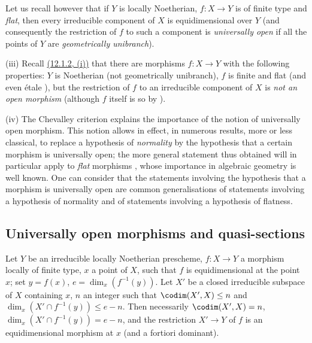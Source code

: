 \begin{remarks}[14.4.10]
Let us recall however  that if $Y$ is locally Noetherian, $f:X\to Y$ is of finite type and \emph{flat}, then every irreducible component of $X$ is equidimensional over $Y$ (and consequently the restriction of $f$ to such a component is \emph{universally open} if all the points of $Y$ are \emph{geometrically unibranch}).

(iii) Recall \hyperref[IV.12.1.2]{(12.1.2, (i))} that there are morphisms $f:X\to Y$ with the following properties: $Y$ is Noetherian (not geometrically unibranch), $f$ is finite and flat (and even \'etale ), but the restriction of $f$ to an irreducible component of $X$ is \emph{not an open morphism} (although $f$ itself is so by ).

(iv) The Chevalley criterion  explains the importance of the notion of universally open morphism.
This notion allows in effect, in numerous results, more or less classical, to replace a hypothesis of \emph{normality} by the hypothesis that a certain morphism is universally open; the more general statement
thus obtained will in particular apply to \emph{flat} morphisms , whose importance in algebraic geometry is well known.
One can consider that the statements involving the hypothesis that a morphism is universally open are common generalisations of statements involving a hypothesis of normality and of statements involving a hypothesis of flatness.
\end{remarks}


\subsection{Universally open morphisms and quasi-sections}
\label{subsection:IV.14.5}
\label{IV.14.5}

\begin{lemma}[14.5.1]
\label{IV.14.5.1}
Let $Y$ be an irreducible locally Noetherian prescheme, $f:X\to Y$ a morphism locally of finite type, $x$ a point of $X$, such that $f$ is equidimensional  at the point $x$; set $y=f(x)$, $e=\dim_x(f^{-1}(y))$.
Let $X'$ be a closed irreducible subspace of $X$ containing $x$, $n$ an integer such that $\codim(X',X)\leq n$ and $\dim_x(X'\cap f^{-1}(y))\leq e-n$.
Then necessarily $\codim(X',X)=n$, $\dim_x(X'\cap f^{-1}(y))=e-n$, and the restriction $X'\to Y$ of $f$ is an equidimensional morphism at $x$ (and a fortiori dominant).
\end{lemma}

